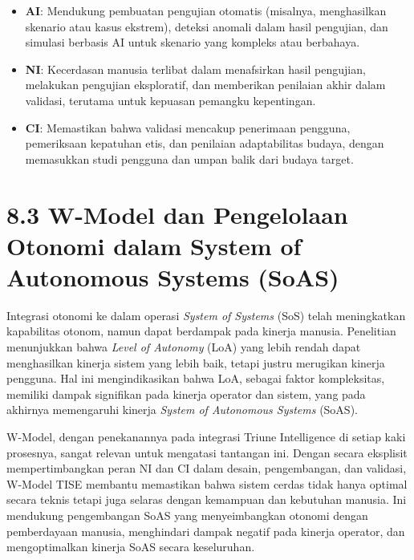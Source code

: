 \documentclass[
  letterpaper,
  DIV=11,
  numbers=noendperiod]{scrreprt}
\providecommand{\tightlist}{%
  \setlength{\itemsep}{0pt}\setlength{\parskip}{0pt}}
\begin{document}
\begin{enumerate}
\begin{itemize}
    \begin{itemize}
    \tightlist
    \item
      \textbf{AI}: Mendukung pembuatan pengujian otomatis (misalnya,
      menghasilkan skenario atau kasus ekstrem), deteksi anomali dalam
      hasil pengujian, dan simulasi berbasis AI untuk skenario yang
      kompleks atau berbahaya.
    \item
      \textbf{NI}: Kecerdasan manusia terlibat dalam menafsirkan hasil
      pengujian, melakukan pengujian eksploratif, dan memberikan
      penilaian akhir dalam validasi, terutama untuk kepuasan pemangku
      kepentingan.
    \item
      \textbf{CI}: Memastikan bahwa validasi mencakup penerimaan
      pengguna, pemeriksaan kepatuhan etis, dan penilaian adaptabilitas
      budaya, dengan memasukkan studi pengguna dan umpan balik dari
      budaya target.
    \end{itemize}
  \end{itemize}
\end{enumerate}

\section{\texorpdfstring{\textbf{8.3 W-Model dan Pengelolaan Otonomi
dalam System of Autonomous Systems
(SoAS)}}{8.3 W-Model dan Pengelolaan Otonomi dalam System of Autonomous Systems (SoAS)}}\label{w-model-dan-pengelolaan-otonomi-dalam-system-of-autonomous-systems-soas}

Integrasi otonomi ke dalam operasi \emph{System of Systems} (SoS) telah
meningkatkan kapabilitas otonom, namun dapat berdampak pada kinerja
manusia. Penelitian menunjukkan bahwa \emph{Level of Autonomy} (LoA)
yang lebih rendah dapat menghasilkan kinerja sistem yang lebih baik,
tetapi justru merugikan kinerja pengguna. Hal ini mengindikasikan bahwa
LoA, sebagai faktor kompleksitas, memiliki dampak signifikan pada
kinerja operator dan sistem, yang pada akhirnya memengaruhi kinerja
\emph{System of Autonomous Systems} (SoAS).

W-Model, dengan penekanannya pada integrasi Triune Intelligence di
setiap kaki prosesnya, sangat relevan untuk mengatasi tantangan ini.
Dengan secara eksplisit mempertimbangkan peran NI dan CI dalam desain,
pengembangan, dan validasi, W-Model TISE membantu memastikan bahwa
sistem cerdas tidak hanya optimal secara teknis tetapi juga selaras
dengan kemampuan dan kebutuhan manusia. Ini mendukung pengembangan SoAS
yang menyeimbangkan otonomi dengan pemberdayaan manusia, menghindari
dampak negatif pada kinerja operator, dan mengoptimalkan kinerja SoAS
secara keseluruhan.
\end{document}
